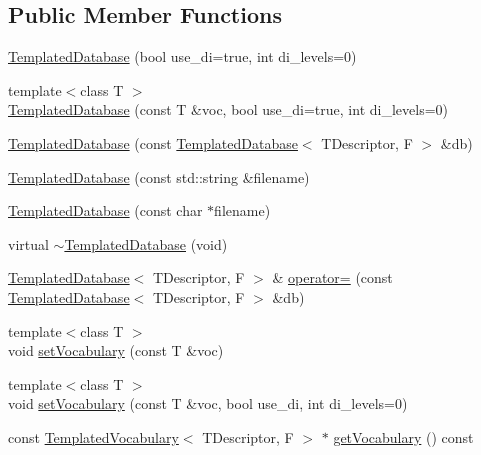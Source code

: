 \subsection*{Public Member Functions}
\begin{DoxyCompactItemize}
\item 
\hyperlink{classDBoW2_1_1TemplatedDatabase_a1353c2b87638fc27696fcc87b09d65cb}{Templated\+Database} (bool use\+\_\+di=true, int di\+\_\+levels=0)
\item 
{\footnotesize template$<$class T $>$ }\\\hyperlink{classDBoW2_1_1TemplatedDatabase_a00022acf352915aa913488fb56fb3506}{Templated\+Database} (const T \&voc, bool use\+\_\+di=true, int di\+\_\+levels=0)
\item 
\hyperlink{classDBoW2_1_1TemplatedDatabase_a8ae59817af3251f63c0345d9b814b23f}{Templated\+Database} (const \hyperlink{classDBoW2_1_1TemplatedDatabase}{Templated\+Database}$<$ T\+Descriptor, F $>$ \&db)
\item 
\hyperlink{classDBoW2_1_1TemplatedDatabase_a811328512cdcb50220ca4f38a8982132}{Templated\+Database} (const std\+::string \&filename)
\item 
\hyperlink{classDBoW2_1_1TemplatedDatabase_a4e93c45263abda6bd1870e1baae820b0}{Templated\+Database} (const char $\ast$filename)
\item 
virtual \hyperlink{classDBoW2_1_1TemplatedDatabase_aca2f045e0974babd7ef5b491b5e24c25}{$\sim$\+Templated\+Database} (void)
\item 
\hyperlink{classDBoW2_1_1TemplatedDatabase}{Templated\+Database}$<$ T\+Descriptor, F $>$ \& \hyperlink{classDBoW2_1_1TemplatedDatabase_a654d8d3c7f80172be1e091663e47535d}{operator=} (const \hyperlink{classDBoW2_1_1TemplatedDatabase}{Templated\+Database}$<$ T\+Descriptor, F $>$ \&db)
\item 
{\footnotesize template$<$class T $>$ }\\void \hyperlink{classDBoW2_1_1TemplatedDatabase_a7d282bfdd4a6883b282fc71d0fd5dcb4}{set\+Vocabulary} (const T \&voc)
\item 
{\footnotesize template$<$class T $>$ }\\void \hyperlink{classDBoW2_1_1TemplatedDatabase_aaf1d0ecfdab16ff0609386e2638e76b6}{set\+Vocabulary} (const T \&voc, bool use\+\_\+di, int di\+\_\+levels=0)
\item 
const \hyperlink{classDBoW2_1_1TemplatedVocabulary}{Templated\+Vocabulary}$<$ T\+Descriptor, F $>$ $\ast$ \hyperlink{classDBoW2_1_1TemplatedDatabase_a2053ce792884183af75e4343026ef7dd}{get\+Vocabulary} () const

\end{DoxyCompactItemize}
